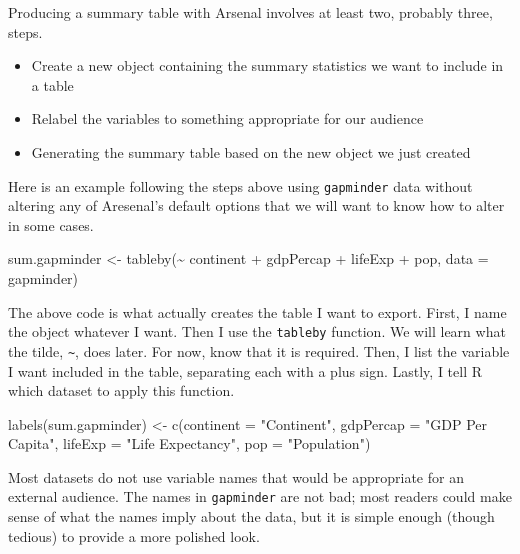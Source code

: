\documentclass[
]{book}
\makeatletter
\newenvironment{Shaded}{\begin{snugshade}}{\end{snugshade}}
\newcommand{\AttributeTok}[1]{\textcolor[rgb]{0.61,0.61,0.61}{#1}}
\newcommand{\FunctionTok}[1]{\textcolor[rgb]{0,0,0}{#1}}
\newcommand{\NormalTok}[1]{#1}
\newcommand{\OtherTok}[1]{\textcolor[rgb]{0.37,0.37,0.37}{#1}}
\newcommand{\SpecialCharTok}[1]{\textcolor[rgb]{0,0,0}{#1}}
\newcommand{\StringTok}[1]{\textcolor[rgb]{0.5,0.5,0.5}{#1}}
\providecommand{\tightlist}{%
  \setlength{\itemsep}{0pt}\setlength{\parskip}{0pt}}
\newenvironment{kframe}{%
\medskip{}
\setlength{\fboxsep}{.8em}
 \def\at@end@of@kframe{}%
 \ifinner\ifhmode%
  \def\at@end@of@kframe{\end{minipage}}%
  \begin{minipage}{\columnwidth}%
 \fi\fi%
 \def\FrameCommand##1{\hskip\@totalleftmargin \hskip-\fboxsep
 \colorbox{shadecolor}{##1}\hskip-\fboxsep
     \hskip-\linewidth \hskip-\@totalleftmargin \hskip\columnwidth}%
 \MakeFramed {\advance\hsize-\width
   \@totalleftmargin\z@ \linewidth\hsize
   \@setminipage}}%
 {\par\unskip\endMakeFramed%
 \at@end@of@kframe}
\renewenvironment{Shaded}{\begin{kframe}}{\end{kframe}}
\makeatother
\begin{document}
Producing a summary table with Arsenal involves at least two, probably three, steps.

\begin{itemize}
\tightlist
\item
  Create a new object containing the summary statistics we want to include in a table
\item
  Relabel the variables to something appropriate for our audience
\item
  Generating the summary table based on the new object we just created
\end{itemize}

Here is an example following the steps above using \texttt{gapminder} data without altering any of Aresenal's default options that we will want to know how to alter in some cases.

\begin{Shaded}
\begin{Highlighting}[]
\NormalTok{sum.gapminder }\OtherTok{\textless{}{-}} \FunctionTok{tableby}\NormalTok{(}\SpecialCharTok{\textasciitilde{}}\NormalTok{ continent }\SpecialCharTok{+}\NormalTok{ gdpPercap }\SpecialCharTok{+}\NormalTok{ lifeExp }\SpecialCharTok{+}\NormalTok{ pop, }\AttributeTok{data =}\NormalTok{ gapminder)}
\end{Highlighting}
\end{Shaded}

The above code is what actually creates the table I want to export. First, I name the object whatever I want. Then I use the \texttt{tableby} function. We will learn what the tilde, \texttt{\textasciitilde{}}, does later. For now, know that it is required. Then, I list the variable I want included in the table, separating each with a plus sign. Lastly, I tell R which dataset to apply this function.

\begin{Shaded}
\begin{Highlighting}[]
\FunctionTok{labels}\NormalTok{(sum.gapminder) }\OtherTok{\textless{}{-}} \FunctionTok{c}\NormalTok{(}\AttributeTok{continent =} \StringTok{"Continent"}\NormalTok{, }\AttributeTok{gdpPercap =} \StringTok{"GDP Per Capita"}\NormalTok{, }\AttributeTok{lifeExp =} \StringTok{"Life Expectancy"}\NormalTok{, }\AttributeTok{pop =} \StringTok{"Population"}\NormalTok{)}
\end{Highlighting}
\end{Shaded}

Most datasets do not use variable names that would be appropriate for an external audience. The names in \texttt{gapminder} are not bad; most readers could make sense of what the names imply about the data, but it is simple enough (though tedious) to provide a more polished look.
\end{document}
